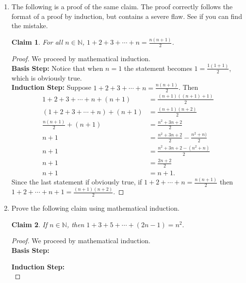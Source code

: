\documentclass[12 pt]{article}
\newcommand{\Z}{\mathbb{Z}}
\newcommand{\N}{\mathbb{N}}
\newcommand{\ds}{\displaystyle}
\theoremstyle{definition}
\theoremstyle{plain}
\theoremstyle{mytheorem}
\newtheorem{claim}{Claim}
\theoremstyle{myexample}
\theoremstyle{mydefinition}
\begin{document}
\begin{enumerate}
\begin{enumerate}
\begin{proof}
Therefore, if $1+2+\cdots+n = \frac{n(n+1)}{2}$ then $1+2+\cdots + n + (n+1) = \frac{(n+1)((n+1)+1)}{2}$.
\end{proof}
\item Together, the basis step and the induction step make up a proof by induction.
\end{enumerate}
\item The following is a proof of the same claim.  The proof correctly follows the format of a proof by induction, but contains a severe flaw.  See if you can find the mistake.
\begin{claim} 
For all $n\in \N$, $\ds 1+2+3+\cdots+n = \frac{n(n+1)}{2}$.
\end{claim}
\begin{proof}  We proceed by mathematical induction.\\
\noindent \textbf{Basis Step:} Notice that when $n=1$ the statement becomes $1= \frac{1(1+1)}{2}$, which is obviously true.\\

\noindent \textbf{Induction Step:}  Suppose $1+2+3+\cdots+n = \frac{n(n+1)}{2}$.  Then
\begin{align*}
1+2+3+\cdots + n + (n+1) &= \frac{(n+1)((n+1)+1)}{2} \\
(1+2+3+\cdots + n) + (n+1) &=  \frac{(n+1)(n+2)}{2}\\
\frac{n(n+1)}{2} + (n+1) &= \frac{n^2+3n+2}{2}\\
n+1 &= \frac{n^2+3n+2}{2}-\frac{n^2+n)}{2} \\
n+1 &= \frac{n^2+3n+2-(n^2+n)}{2}\\
n+1 &= \frac{2n+2}{2}\\
n+1 &= n+1.
\end{align*}
Since the last statement if obviously true, if $1+2+\cdots+n = \frac{n(n+1)}{2}$ then $1+2+\cdots+n+1 = \frac{(n+1)(n+2)}{2}$.
\end{proof}

\newpage

\item Prove the following claim using mathematical induction.
\begin{claim} If $n \in \N$, then $1+3+5 + \cdots + (2n-1) = n^2.$
\end{claim}

\begin{proof}  We proceed by mathematical induction.\\
\noindent \textbf{Basis Step:}\\
\vspace{1in}

\noindent \textbf{Induction Step:}
\vspace{5.5in}\\
\end{proof}
\end{enumerate}
\end{document}

